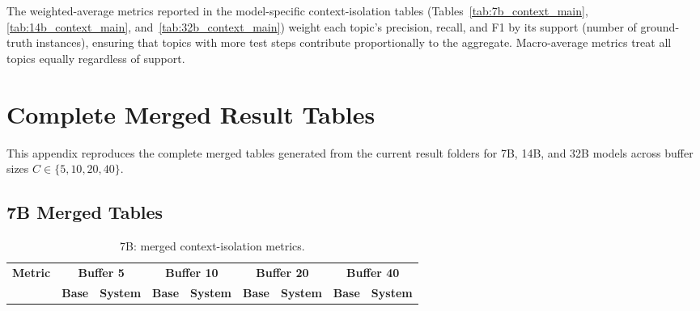 \documentclass[pdflatex,sn-mathphys-num]{sn-jnl}%
\theoremstyle{thmstyleone}%
\theoremstyle{thmstyletwo}%
\theoremstyle{thmstylethree}%
\begin{document}
\begin{appendices}
The weighted-average metrics reported in the model-specific context-isolation tables (Tables~\ref{tab:7b_context_main}, \ref{tab:14b_context_main}, and~\ref{tab:32b_context_main}) weight each topic's precision, recall, and F1 by its support (number of ground-truth instances), ensuring that topics with more test steps contribute proportionally to the aggregate. Macro-average metrics treat all topics equally regardless of support.


\section{Complete Merged Result Tables}\label{secA4}

This appendix reproduces the complete merged tables generated from the current result folders for 7B, 14B, and 32B models across buffer sizes $C \in \{5,10,20,40\}$.

\subsection{7B Merged Tables}\label{app:7b_merged}
\begin{landscape}
\tiny
\begin{longtable}{@{}p{3.8cm}cccccccc@{}}
\caption{7B: merged context-isolation metrics.}\label{tab:app_7b_context}\\

\toprule
\textbf{Metric} & \multicolumn{2}{c}{\textbf{Buffer 5}} & \multicolumn{2}{c}{\textbf{Buffer 10}} & \multicolumn{2}{c}{\textbf{Buffer 20}} & \multicolumn{2}{c}{\textbf{Buffer 40}} \\
\cmidrule(lr){2-3}\cmidrule(lr){4-5}\cmidrule(lr){6-7}\cmidrule(lr){8-9}
 & \textbf{Base} & \textbf{System} & \textbf{Base} & \textbf{System} & \textbf{Base} & \textbf{System} & \textbf{Base} & \textbf{System} \\
\midrule
\endfirsthead


\end{longtable}
\end{landscape}
\end{appendices}
\end{document}
